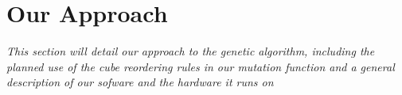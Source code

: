 \section{Our Approach}

\emph{This section will detail our approach to the genetic algorithm, 
including the planned use of the cube reordering rules in our mutation function
and a general description of our sofware and the hardware it runs on}